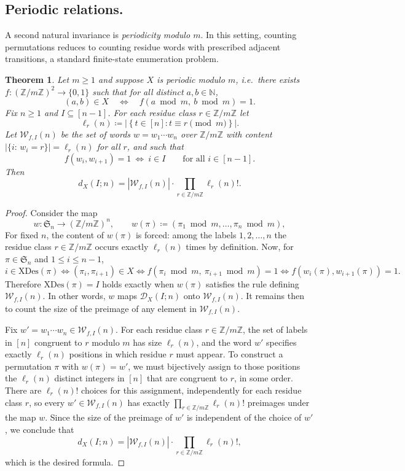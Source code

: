 \documentclass[12pt]{amsart}
\newtheorem{theorem}{Theorem}[section]
\theoremstyle{definition}
\theoremstyle{remark}
\newcommand{\N}{\mathbb{N}}
\newcommand{\Z}{\mathbb{Z}}
\newcommand{\Sset}{\mathfrak{S}}
\newcommand{\XD}{\mathrm{XDes}}
\newcommand{\set}[1]{\left\{#1\right\}}
\newcommand{\abs}[1]{\left|#1\right|}
\begin{document}
\subsection{Periodic relations.}
A second natural invariance is \emph{periodicity modulo $m$}. In this setting, counting permutations reduces to
counting residue words with prescribed adjacent transitions, a standard finite-state enumeration problem.

\begin{theorem}\label{thm:periodic-reduction}
Let $m\ge 1$ and suppose $X$ is periodic modulo $m$, i.e.\ there exists
$f:(\Z/m\Z)^2\to\{0,1\}$ such that for all distinct $a,b\in\N$,
\[
(a,b)\in X\quad\Longleftrightarrow\quad f(a\bmod m,\ b\bmod m)=1.
\]
Fix $n\ge 1$ and $I\subseteq[n-1]$. For each residue class $r\in\Z/m\Z$ let
\[
\ell_r(n)\coloneqq \abs{\set{t\in[n]: t\equiv r\pmod m}}.
\]
Let $\mathcal{W}_{f,I}(n)$ be the set of words $w=w_1\cdots w_n$ over $\Z/m\Z$ with content
$\abs{\{i:\,w_i=r\}}=\ell_r(n)$ for all $r$, and such that
\[
f(w_i,w_{i+1})=1\ \Longleftrightarrow\ i\in I\qquad\text{for all }i\in[n-1].
\]
Then
\[
d_X(I;n)=\abs{\mathcal{W}_{f,I}(n)}\cdot \prod_{r\in\Z/m\Z}\ell_r(n)!.
\]
\end{theorem}

\begin{proof}
Consider the map
\[
 w:\Sset_n\longrightarrow (\Z/m\Z)^n,\qquad
 w(\pi)\coloneqq (\pi_1\bmod m,\ldots,\pi_n\bmod m),
\]
For fixed \(n\), the content of \(w(\pi)\) is forced: among the
labels \(1,2,\dots,n\) the residue class \(r\in\Z/m\Z\) occurs exactly \(\ell_r(n)\) times by definition. Now,
for \(\pi\in\Sset_n\) and \(1\le i\le n-1\),
\[
 i\in\XD(\pi)
 \Longleftrightarrow
 (\pi_i,\pi_{i+1})\in X
 \Longleftrightarrow
 f(\pi_i\bmod m,\ \pi_{i+1}\bmod m)=1
 \Longleftrightarrow
 f(w_i(\pi),w_{i+1}(\pi))=1.
\]
Therefore \(\XD(\pi)=I\) holds exactly when \(w(\pi)\) satisfies the
 rule defining \(\mathcal{W}_{f,I}(n)\).  In other words, \(w\) maps \(\mathcal{D}_X(I;n)\) onto
\(\mathcal{W}_{f,I}(n)\). It remains then to count the size of the preimage of any element in \(\mathcal{W}_{f,I}(n)\).  

Fix \(w'=w_1\cdots w_n\in\mathcal{W}_{f,I}(n)\).  For each residue class
\(r\in\Z/m\Z\), the set of labels in \([n]\) congruent to \(r\) modulo \(m\) has size \(\ell_r(n)\), and the word \(w'\)
specifies exactly \(\ell_r(n)\) positions in which residue \(r\) must appear.  To construct a permutation \(\pi\) with
\(w(\pi)=w'\), we must bijectively assign to those positions the \(\ell_r(n)\) distinct integers in \([n]\) that are
congruent to \(r\), in some order.  There are \(\ell_r(n)!\) choices for this assignment, independently for each residue
class \(r\), so every \(w' \in\mathcal{W}_{f,I}(n)\) has exactly \(\prod_{r\in\Z/m\Z}\ell_r(n)!\) preimages under the map
\(w\). Since the size of the preimage of $w'$ is independent of the choice of $w'$, we conclude that
\[
 d_X(I;n)=\abs{\mathcal{W}_{f,I}(n)}\cdot \prod_{r\in\Z/m\Z}\ell_r(n)!,
\]
which is the desired formula.  
\end{proof}
\end{document}
